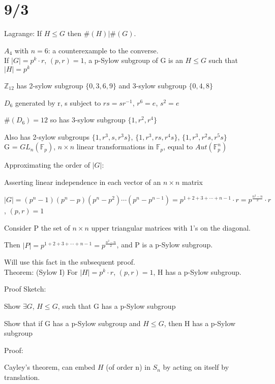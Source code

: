 \documentclass[12pt]{article}
\begin{document}
\section{9/3}

Lagrange: If $H \leq G$ then $\#(H)|\#(G)$.

$A_4$ with $n = 6$: a counterexample to the converse.\\

\noindent
If $|G| = p^k \cdot r$, $(p, r) = 1$, a p-Sylow subgroup of G is an $H \leq G$ such that $|H| = p^k$

\noindent
$\mathds{Z}_{12}$ has 2-sylow subgroup $\{0, 3, 6, 9\}$ and 3-sylow subgroup $\{0, 4, 8\}$

\noindent
$D_6$ generated by r, s subject to $rs = sr^{-1}$, $r^6 = e$, $s^2 = e$

$\#(D_6) = 12$ so has 3-sylow subgroup $\{1, r^2, r^4\}$

Also has 2-sylow subgroups $\{1, r^3, s, r^3s\}$, $\{1, r^3, rs, r^4s\}$, $\{1, r^3, r^2s, r^5s\}$\\

\noindent
G = $GL_n(\mathds{F}_p)$, $n \times n$ linear transformations in $\mathds{F}_p$, equal to $Aut(\mathds{F}_p^n)$

\noindent
Approximating the order of $|G|$:  

Asserting linear independence in each vector of an $n \times n$ matrix

$|G| = (p^n - 1)(p^n-p)(p^n-p^2)\cdots(p^n-p^{n-1}) = p^{1 + 2 + 3 + \cdots + n - 1}\cdot r = p^{\frac{n^2 - n}{2}} \cdot r$, $(p, r) = 1$

Consider P the set of $n \times n$ upper triangular matrices with 1's on the diagonal.

Then $|P| = p^{1 + 2 + 3 + \cdots + n - 1} = p^{\frac{n^2 - n}{2}}$, and P is a p-Sylow subgroup.

Will use this fact in the subsequent proof.\\

\noindent
Theorem: (Sylow I) For $|H| = p^k \cdot r$, $(p, r) = 1$, H has a p-Sylow subgroup.

\noindent
Proof Sketch:

Show $\exists G$, $H \leq G$, such that G has a p-Sylow subgroup

Show that if G has a p-Sylow subgroup and $H \leq G$, then H has a p-Sylow subgroup

\noindent
Proof:

Cayley's theorem, can embed $H$ (of order n) in $S_n$ by acting on itself by translation.
\end{document}
